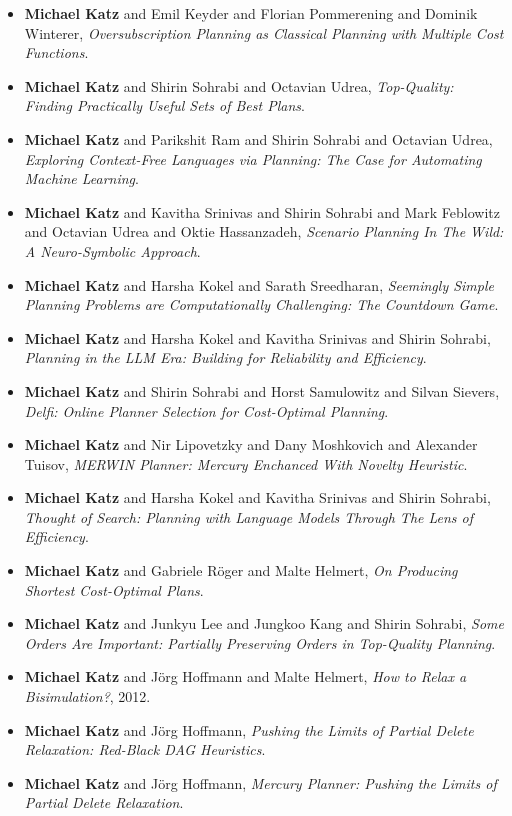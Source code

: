 \begin{itemize}[noitemsep]
\item {\bf Michael Katz} and Emil Keyder and Florian Pommerening and Dominik Winterer, {\it Oversubscription Planning as Classical Planning with Multiple Cost Functions}.
\item {\bf Michael Katz} and Shirin Sohrabi and Octavian Udrea, {\it Top-Quality: Finding Practically Useful Sets of Best Plans}.
\item {\bf Michael Katz} and Parikshit Ram and Shirin Sohrabi and Octavian Udrea, {\it Exploring Context-Free Languages via Planning: The Case for Automating Machine Learning}.
\item {\bf Michael Katz} and Kavitha Srinivas and Shirin Sohrabi and Mark Feblowitz and Octavian Udrea and Oktie Hassanzadeh, {\it Scenario Planning In The Wild: A Neuro-Symbolic Approach}.
\item {\bf Michael Katz} and Harsha Kokel and Sarath Sreedharan, {\it Seemingly Simple Planning Problems are Computationally Challenging: The Countdown Game}.
\item {\bf Michael Katz} and Harsha Kokel and Kavitha Srinivas and Shirin Sohrabi, {\it Planning in the LLM Era: Building for Reliability and Efficiency}.
\item {\bf Michael Katz} and Shirin Sohrabi and Horst Samulowitz and Silvan Sievers, {\it Delfi: Online Planner Selection for Cost-Optimal Planning}.
\item {\bf Michael Katz} and Nir Lipovetzky and Dany Moshkovich and Alexander Tuisov, {\it MERWIN Planner: Mercury Enchanced With Novelty Heuristic}.
\item {\bf Michael Katz} and Harsha Kokel and Kavitha Srinivas and Shirin Sohrabi, {\it Thought of Search: Planning with Language Models Through The Lens of Efficiency}.
\item {\bf Michael Katz} and Gabriele Röger and Malte Helmert, {\it On Producing Shortest Cost-Optimal Plans}.
\item {\bf Michael Katz} and Junkyu Lee and Jungkoo Kang and Shirin Sohrabi, {\it Some Orders Are Important: Partially Preserving Orders in Top-Quality Planning}.
\item {\bf Michael Katz} and Jörg Hoffmann and Malte Helmert, {\it How to Relax a Bisimulation?}, 2012.
\item {\bf Michael Katz} and Jörg Hoffmann, {\it Pushing the Limits of Partial Delete Relaxation: Red-Black DAG Heuristics}.
\item {\bf Michael Katz} and Jörg Hoffmann, {\it Mercury Planner: Pushing the Limits of Partial Delete Relaxation}.

\end{itemize}
